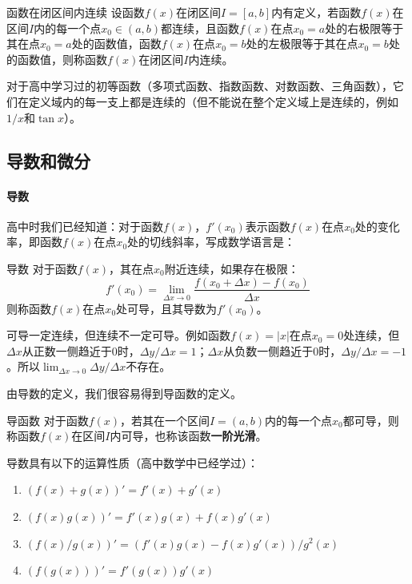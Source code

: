 \begin{definition}{函数在闭区间内连续}{}
    设函数$f(x)$在闭区间$I = [a, b]$内有定义，若函数$f(x)$在区间$I$内的每一个点$x_0 \in (a, b)$都连续，且函数$f(x)$在点$x_0 = a$处的右极限等于其在点$x_0 = a$处的函数值，函数$f(x)$在点$x_0 = b$处的左极限等于其在点$x_0 = b$处的函数值，则称函数$f(x)$在闭区间$I$内连续。
\end{definition}

对于高中学习过的初等函数（多项式函数、指数函数、对数函数、三角函数），它们在定义域内的每一支上都是连续的（但不能说在整个定义域上是连续的，例如$1/x$和$\tan x$）。

\subsection{导数和微分}

\paragraph{导数} 高中时我们已经知道：对于函数$f(x)$，$f'(x_0)$表示函数$f(x)$在点$x_0$处的变化率，即函数$f(x)$在点$x_0$处的切线斜率，写成数学语言是：

\begin{definition}{导数}{}
    对于函数$f(x)$，其在点$x_0$附近连续，如果存在极限：
    \begin{equation}\label{eq:derivative}
        f'(x_0) = \lim_{\Delta x \to 0} \frac{f(x_0 + \Delta x) - f(x_0)}{\Delta x}
    \end{equation}
    则称函数$f(x)$在点$x_0$处可导，且其导数为$f'(x_0)$。
\end{definition}

可导一定连续，但连续不一定可导。例如函数$f(x) = |x|$在点$x_0 = 0$处连续，但$\Delta x$从正数一侧趋近于0时，$\Delta y / \Delta x = 1$；$\Delta x$从负数一侧趋近于0时，$\Delta y / \Delta x = -1$。所以$\lim_{\Delta x \to 0} \Delta y / \Delta x$不存在。

由导数的定义，我们很容易得到导函数的定义。
\begin{definition}{导函数}{}
    对于函数$f(x)$，若其在一个区间$I = (a, b)$内的每一个点$x_0$都可导，则称函数$f(x)$在区间$I$内可导，也称该函数\textbf{一阶光滑}。
\end{definition}

导数具有以下的运算性质（高中数学中已经学过）：
\begin{enumerate}
    \item $(f(x) + g(x))' = f'(x) + g'(x)$
    \item $(f(x)g(x))' = f'(x)g(x) + f(x)g'(x)$
    \item $(f(x)/g(x))' = (f'(x)g(x) - f(x)g'(x)) / g^2(x)$
    \item $(f(g(x)))' = f'(g(x))g'(x)$
\end{enumerate}

